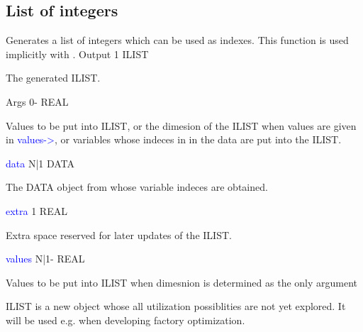 \subsection{List of integers}
\label{ilist}
Generates a list of integers which can be used as indexes. This function
is used implicitly with {}.
\vspace{0.3cm}
\hline
\vspace{0.3cm}
\noindent Output \tabto{3cm}  1 \tabto{5cm}   ILIST  \tabto{7cm}
\begin{changemargin}{3cm}{0cm}
\noindent The generated ILIST.
\end{changemargin}
\vspace{0.3cm}
\hline
\vspace{0.3cm}
\noindent Args \tabto{3cm}  0-  \tabto{5cm}  REAL  \tabto{7cm}
\begin{changemargin}{3cm}{0cm}
\noindent  Values to be put into ILIST, or the dimesion
of the ILIST when values are given in \textcolor{blue}{values->},  or variables whose indeces
in in the data are put into the ILIST.
\end{changemargin}
\vspace{0.3cm}
\hline
\vspace{0.3cm}
\noindent \textcolor{blue}{data} \tabto{3cm} N|1 \tabto{5cm}   DATA \tabto{7cm}
\begin{changemargin}{3cm}{0cm}
\noindent  The DATA object from whose variable indeces are obtained.
\end{changemargin}
\vspace{0.3cm}
\hline
\vspace{0.3cm}
\noindent \textcolor{blue}{extra}  \tabto{3cm}  1 \tabto{5cm}  REAL  \tabto{7cm}
\begin{changemargin}{3cm}{0cm}
\noindent  Extra space reserved for later updates of the ILIST.
\end{changemargin}
\vspace{0.3cm}
\hline
\vspace{0.3cm}
\noindent \textcolor{blue}{values}  \tabto{3cm} N|1- \tabto{5cm}   REAL \tabto{7cm}
\begin{changemargin}{3cm}{0cm}
\noindent  Values to be put into ILIST when dimesnion is determined as the
only argument
\end {changemargin}
\hline
\vspace{0.2cm}
\begin{note}
ILIST is a new object whose all utilization possiblities are not yet explored.
It will be used e.g. when developing factory optimization.
\end{note}
